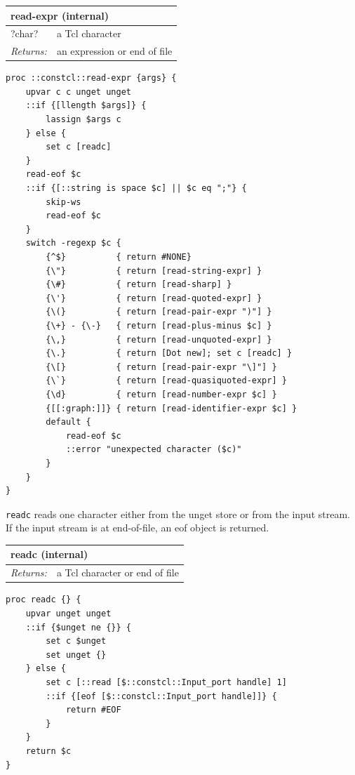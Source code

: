 \documentclass[twoside,9pt]{report}
\begin{document}
\begin{tabular}{ |l l| }
\hline
\multicolumn{2}{|l|}{read-expr (internal)} \\
\hline
?char? & a Tcl character \\
\textit{Returns:} & an expression or end of file \\
\hline
\end{tabular}

\noindent\makebox[\linewidth]{\rule{\linewidth}{0.4pt}}
\begin{lstlisting}
proc ::constcl::read-expr {args} {
    upvar c c unget unget
    ::if {[llength $args]} {
        lassign $args c
    } else {
        set c [readc]
    }
    read-eof $c
    ::if {[::string is space $c] || $c eq ";"} {
        skip-ws
        read-eof $c
    }
    switch -regexp $c {
        {^$}          { return #NONE}
        {\"}          { return [read-string-expr] }
        {\#}          { return [read-sharp] }
        {\'}          { return [read-quoted-expr] }
        {\(}          { return [read-pair-expr ")"] }
        {\+} - {\-}   { return [read-plus-minus $c] }
        {\,}          { return [read-unquoted-expr] }
        {\.}          { return [Dot new]; set c [readc] }
        {\[}          { return [read-pair-expr "\]"] }
        {\`}          { return [read-quasiquoted-expr] }
        {\d}          { return [read-number-expr $c] }
        {[[:graph:]]} { return [read-identifier-expr $c] }
        default {
            read-eof $c
            ::error "unexpected character ($c)"
        }
    }
}
\end{lstlisting}
\noindent\makebox[\linewidth]{\rule{\linewidth}{0.4pt}}

\texttt{readc} reads one character either from the unget store or from the input stream. If the input stream is at end-of-file, an eof object is returned.

\begin{tabular}{ |l l| }
\hline
\multicolumn{2}{|l|}{readc (internal)} \\
\hline
\textit{Returns:} & a Tcl character or end of file \\
\hline
\end{tabular}

\noindent\makebox[\linewidth]{\rule{\linewidth}{0.4pt}}
\begin{lstlisting}
proc readc {} {
    upvar unget unget
    ::if {$unget ne {}} {
        set c $unget
        set unget {}
    } else {
        set c [::read [$::constcl::Input_port handle] 1]
        ::if {[eof [$::constcl::Input_port handle]]} {
            return #EOF
        }
    }
    return $c
}
\end{lstlisting}
\noindent\makebox[\linewidth]{\rule{\linewidth}{0.4pt}}
\end{document}

